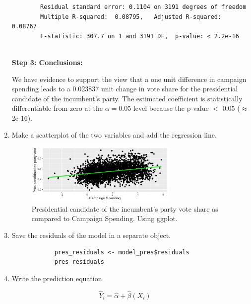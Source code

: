 \documentclass[12pt,letterpaper]{article}
\begin{document}
\begin{enumerate}
\begin{verbatim}
		Residual standard error: 0.1104 on 3191 degrees of freedom
		Multiple R-squared:  0.08795,	Adjusted R-squared:  0.08767 
		F-statistic: 307.7 on 1 and 3191 DF,  p-value: < 2.2e-16
	
		\end{verbatim}
		
		\textbf{Step 3: Conclusions:}
		
		We have evidence to support the view that a one unit difference in campaign spending leads to a 0.023837 unit change in vote share for the presidential candidate of the incumbent's party. The estimated coefficient is statistically differentiable from zero at the $\alpha=0.05$ level because the p-value $<$ 0.05 ($\approx $2e-16). \\
		
		
		\item Make a scatterplot of the two variables and add the regression line. 	
		
		  
		
		\begin{figure}[h!]
			\centering
			\caption{\footnotesize Presidential candidate of the incumbent's party vote share as compared to Campaign Spending. Using ggplot.}
			\includegraphics[width=0.69\textwidth]{vote_share_pres_scatter.png}
			
		\end{figure} 
				
		\newpage
		
		\item Save the residuals of the model in a separate object.	
		
		\begin{verbatim}
			pres_residuals <- model_pres$residuals
			pres_residuals
		\end{verbatim}
		
		
		\item Write the prediction equation.
		
		\end{enumerate}		
		
		{\large 			$$\hat{Y}_i = \hat{\alpha} +  \hat{\beta}(X_i) $$}
		
\end{document}
